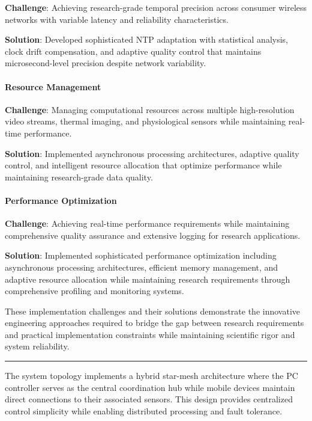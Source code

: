 \documentclass[12pt,a4paper]{report}
\begin{document}
\textbf{Challenge}: Achieving research-grade temporal precision across consumer wireless networks with variable latency and
reliability characteristics.

\textbf{Solution}: Developed sophisticated NTP adaptation with statistical analysis, clock drift compensation, and adaptive
quality control that maintains microsecond-level precision despite network variability.

\paragraph{Resource Management}

\textbf{Challenge}: Managing computational resources across multiple high-resolution video streams, thermal imaging, and
physiological sensors while maintaining real-time performance.

\textbf{Solution}: Implemented asynchronous processing architectures, adaptive quality control, and intelligent resource
allocation that optimize performance while maintaining research-grade data quality.

\paragraph{Performance Optimization}

\textbf{Challenge}: Achieving real-time performance requirements while maintaining comprehensive quality assurance and
extensive logging for research applications.

\textbf{Solution}: Implemented sophisticated performance optimization including asynchronous processing architectures,
efficient memory management, and adaptive resource allocation while maintaining research requirements through
comprehensive profiling and monitoring systems.

These implementation challenges and their solutions demonstrate the innovative engineering approaches required to bridge
the gap between research requirements and practical implementation constraints while maintaining scientific rigor and
system reliability.

\hrule

The system topology implements a hybrid star-mesh architecture where the PC controller serves as the central
coordination hub while mobile devices maintain direct connections to their associated sensors. This design provides
centralized control simplicity while enabling distributed processing and fault tolerance.
\end{document}
